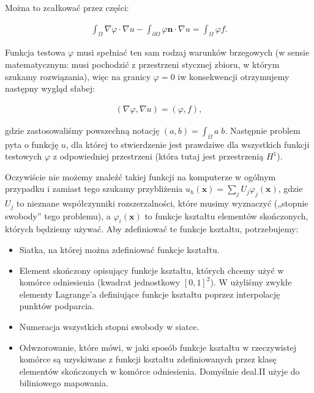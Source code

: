 \documentclass[]{pracamgr}
\begin{document}
      Można to zcałkować przez części:
      
      \begin{align*}
        \int_\Omega \nabla\varphi \cdot \nabla u
        -
        \int_{\partial\Omega} \varphi \mathbf{n}\cdot \nabla u
         = \int_\Omega \varphi f.
      \end{align*}
      
      Funkcja testowa $\varphi$ musi spełniać ten sam rodzaj warunków brzegowych (w sensie matematycznym: musi pochodzić z przestrzeni stycznej zbioru, w którym szukamy rozwiązania), więc na granicy $\varphi=0$ iw konsekwencji otrzymujemy następny wygląd słabej:
      
      \begin{align*}
        (\nabla\varphi, \nabla u)
         = (\varphi, f),
      \end{align*}

      gdzie zastosowaliśmy powszechną notację $(a,b)=\int_\Omega a\; b$. Następnie problem pyta o funkcję $u$, dla której to stwierdzenie jest prawdziwe dla wszystkich funkcji testowych $\varphi$ z odpowiedniej przestrzeni (która tutaj jest przestrzenią $H^1$).

      Oczywiście nie możemy znaleźć takiej funkcji na komputerze w ogólnym przypadku i zamiast tego szukamy przybliżenia $u_h(\mathbf x)=\sum_j U_j \varphi_j(\mathbf x)$, gdzie $U_j$ to nieznane współczynniki rozszerzalności, które musimy wyznaczyć („stopnie swobody” tego problemu), a $\varphi_i(\mathbf x)$ to funkcje kształtu elementów skończonych, których będziemy używać. Aby zdefiniować te funkcje kształtu, potrzebujemy:
      
      \begin{itemize}
        \item Siatka, na której można zdefiniować funkcje kształtu.
        \item Element skończony opisujący funkcje kształtu, których chcemy użyć w komórce odniesienia (kwadrat jednostkowy $[0,1]^2$). W użyliśmy zwykłe elementy Lagrange'a definiujące funkcje kształtu poprzez interpolację punktów podparcia.
        \item Numeracja wszystkich stopni swobody w siatce.
        \item Odwzorowanie, które mówi, w jaki sposób funkcje kształtu w rzeczywistej komórce są uzyskiwane z funkcji kształtu zdefiniowanych przez klasę elementów skończonych w komórce odniesienia. Domyślnie  deal.II użyje do biliniowego mapowania.
      \end{itemize}
\end{document}
